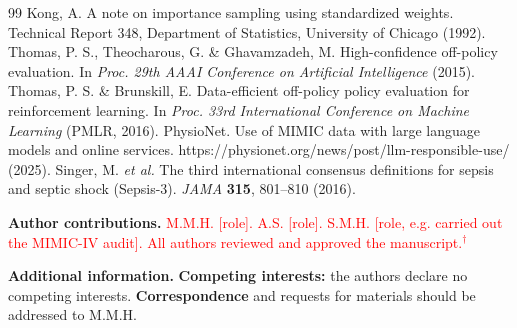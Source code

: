 \documentclass[10pt,a4paper]{article}
\newcommand{\verify}[1]{\textcolor{red}{#1$^{\dagger}$}}
\begin{document}
{\begin{thebibliography}{99}
 Kong, A. A note on importance sampling using standardized weights. Technical Report 348, Department of Statistics, University of Chicago (1992).
 Thomas, P. S., Theocharous, G. \& Ghavamzadeh, M. High-confidence off-policy evaluation. In \emph{Proc. 29th AAAI Conference on Artificial Intelligence} (2015).
 Thomas, P. S. \& Brunskill, E. Data-efficient off-policy policy evaluation for reinforcement learning. In \emph{Proc. 33rd International Conference on Machine Learning} (PMLR, 2016).
 PhysioNet. Use of MIMIC data with large language models and online services. https://physionet.org/news/post/llm-responsible-use/ (2025).
 Singer, M. \emph{et al.} The third international consensus definitions for sepsis and septic shock (Sepsis-3). \emph{JAMA} \textbf{315}, 801--810 (2016).
\end{thebibliography}}



\medskip\noindent\textbf{Author contributions.} \verify{M.M.H. [role]. A.S. [role]. S.M.H. [role, e.g. carried out the MIMIC-IV audit]. All authors reviewed and approved the manuscript.}

\medskip\noindent\textbf{Additional information.} \textbf{Competing interests:} the authors declare no competing interests. \textbf{Correspondence} and requests for materials should be addressed to M.M.H.
\end{document}
